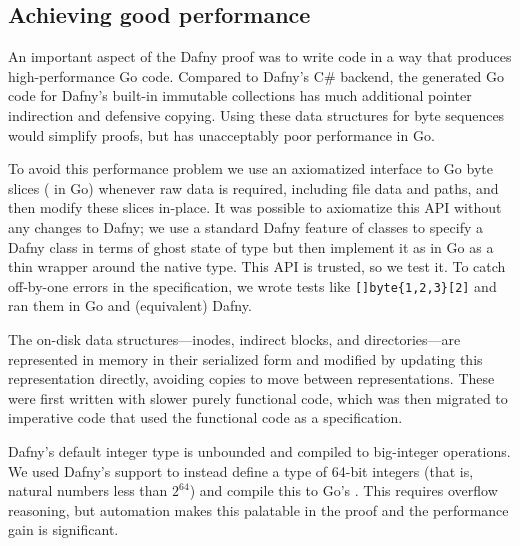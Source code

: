\subsection{Achieving good performance}

An important aspect of the Dafny proof was to write code in a way that produces
high-performance Go code.
Compared to Dafny's C\# backend, the generated Go code for Dafny's built-in
immutable collections has much
additional pointer indirection and defensive copying. Using these data
structures for byte sequences would simplify proofs, but has unacceptably poor
performance in Go.

To avoid this performance problem we use an axiomatized interface to
Go byte slices ( in Go) whenever raw data is required, including file
data and paths, and then modify these slices in-place. It was possible to
axiomatize this API without any changes to Dafny; we use a standard Dafny
feature of  classes to specify a Dafny class  in terms of
ghost state of type  but then implement it as in Go as a thin
wrapper around the native  type. This API is trusted, so we
test it. To catch off-by-one errors in the specification, we wrote
tests like \verb![]byte{1,2,3}[2]! and ran them in Go and
(equivalent) Dafny.

The on-disk data structures---inodes, indirect
blocks, and directories---are represented in memory in their serialized form and
modified by updating this representation directly, avoiding copies to move
between representations. These were first written with slower purely
functional code, which was then migrated to imperative code that
used the functional code as a specification.


Dafny's default integer type  is unbounded and compiled to big-integer
operations. We used Dafny's
 support to instead define a type of 64-bit integers (that
is, natural numbers less than $2^{64}$) and compile this to Go's .
This requires overflow reasoning, but
automation makes this palatable in the proof and the performance gain is
significant.



